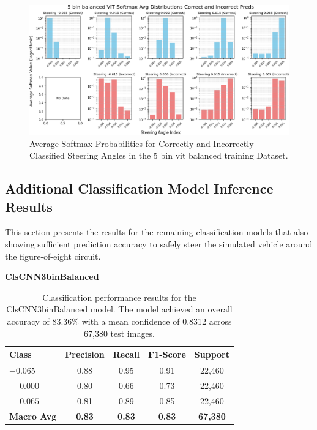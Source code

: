 \begin{figure}[H]
    \centering
    \includegraphics[width=1\linewidth]{Figures/Results/5_bins_vit_softmax_dist_plot_balanced.png}
    \caption{Average Softmax Probabilities for Correctly and Incorrectly Classified Steering Angles in the 5 bin vit balanced training Dataset.}
    \label{fig:5_bins_vit_softmax_dist_balanced}
\end{figure}


\subsection{Additional Classification Model Inference Results}

This section presents the results for the remaining classification models that also showing sufficient prediction accuracy to safely steer the simulated vehicle around the figure-of-eight circuit.


\textbf{ClsCNN3binBalanced}

\begin{table}[htbp]
\centering
\begin{tabular}{@{}lcccc@{}}
\toprule
\textbf{Class} & \textbf{Precision} & \textbf{Recall} & \textbf{F1-Score} & \textbf{Support} \\
\midrule
$-0.065$ & 0.88 & 0.95 & 0.91 & 22,460 \\
$\phantom{-}0.000$ & 0.80 & 0.66 & 0.73 & 22,460 \\
$\phantom{-}0.065$ & 0.81 & 0.89 & 0.85 & 22,460 \\
\midrule
\textbf{Macro Avg} & \textbf{0.83} & \textbf{0.83} & \textbf{0.83} & \textbf{67,380} \\
\bottomrule
\end{tabular}
\caption{Classification performance results for the ClsCNN3binBalanced model. The model achieved an overall accuracy of 83.36\% with a mean confidence of 0.8312 across 67,380 test images.}
\label{tab:clf_report_ClsCNN3binBalanced}
\end{table}


